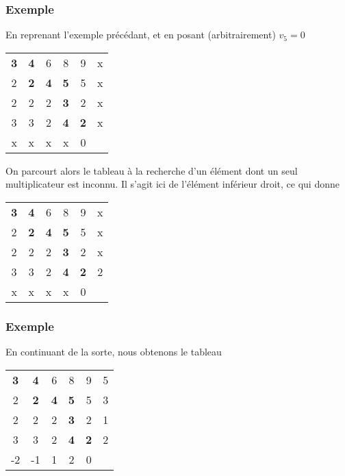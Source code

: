\documentclass[usepdftitle=false]{beamer}
\begin{document}
\begin{frame}
\frametitle{Exemple}

En reprenant l'exemple précédant, et en posant (arbitrairement) $v_5 = 0$
\begin{center}
	\begin{tabular}{ccccc|c}
		{\bf 3} & {\bf 4} & 6 & 8 & 9 & x \\
		2 & {\bf 2} & {\bf 4} & {\bf 5} & 5 & x \\
		2 & 2 & 2 & {\bf 3} & 2 & x \\
		3 & 3 & 2 & {\bf 4} & {\bf 2} & x \\
		\hline
		x & x & x & x & 0 & 
	\end{tabular}
\end{center}
On parcourt alors le tableau à la recherche d'un élément dont un seul multiplicateur est inconnu. Il s'agit ici de l'élément inférieur droit, ce qui donne
\begin{center}
	\begin{tabular}{ccccc|c}
		{\bf 3} & {\bf 4} & 6 & 8 & 9 & x \\
		2 & {\bf 2} & {\bf 4} & {\bf 5} & 5 & x \\
		2 & 2 & 2 & {\bf 3} & 2 & x \\
		3 & 3 & 2 & {\bf 4} & {\bf 2} & 2 \\
		\hline
		x & x & x & x & 0 & 
	\end{tabular}
\end{center}

\end{frame}

\begin{frame}
\frametitle{Exemple}

En continuant de la sorte, nous obtenons le tableau
\begin{center}
\begin{tabular}{ccccc|c}
{\bf 3} & {\bf 4} & 6 & 8 & 9 & 5 \\
2 & {\bf 2} & {\bf 4} & {\bf 5} & 5 & 3 \\
2 & 2 & 2 & {\bf 3} & 2 & 1 \\
3 & 3 & 2 & {\bf 4} & {\bf 2} & 2 \\
\hline
-2 & -1 & 1 & 2 & 0 & 
\end{tabular}
\end{center}


\end{frame}
\end{document}
